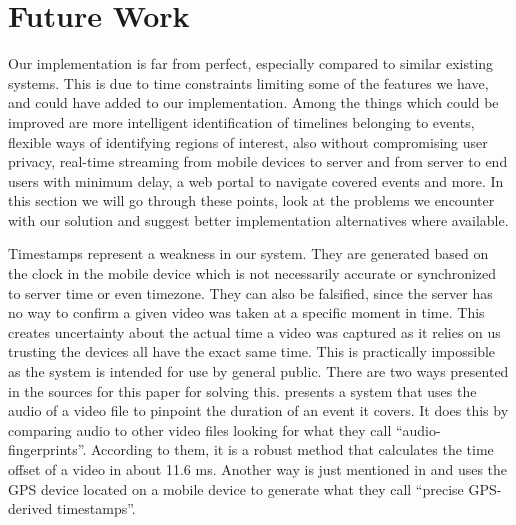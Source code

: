 \documentclass[conference]{IEEEtran}
\begin{document}
%
%
%
%

\section{Future Work}

Our implementation is far from perfect, especially compared to similar existing systems.
This is due to time constraints limiting some of the features we have, and could have added to our implementation.
Among the things which could be improved are more intelligent identification of timelines belonging to events,
flexible ways of identifying regions of interest, also without compromising user privacy, real-time streaming from mobile devices to server 
and from server to end users with minimum delay, a web portal to navigate covered events and more.
In this section we will go through these points, look at the problems we encounter with our solution 
and suggest better implementation alternatives where available.

Timestamps represent a weakness in our system. They are generated based on the clock in the mobile
device which is not necessarily accurate or synchronized to server time or even timezone. They can also
be falsified, since the server has no way to confirm a given video was taken at a specific moment in time.
This creates uncertainty about the actual time a video was captured as it relies on us trusting the devices
all have the exact same time. This is practically impossible as the system is intended for use by general public. 
There are two ways presented in the sources for this paper for solving this. 
\cite{shrestha_automatic_2010} presents a system that uses the audio of a video file to pinpoint the duration of an event it covers.
It does this by comparing audio to other video files looking for what they call “audio-fingerprints”. 
According to them, it is a robust method that calculates the time offset of a video in about 11.6 ms. 
Another way is just mentioned in \cite{ jain_focus:_2013} and uses the GPS device located on a mobile device
to generate what they call “precise GPS-derived timestamps”.
\end{document}
